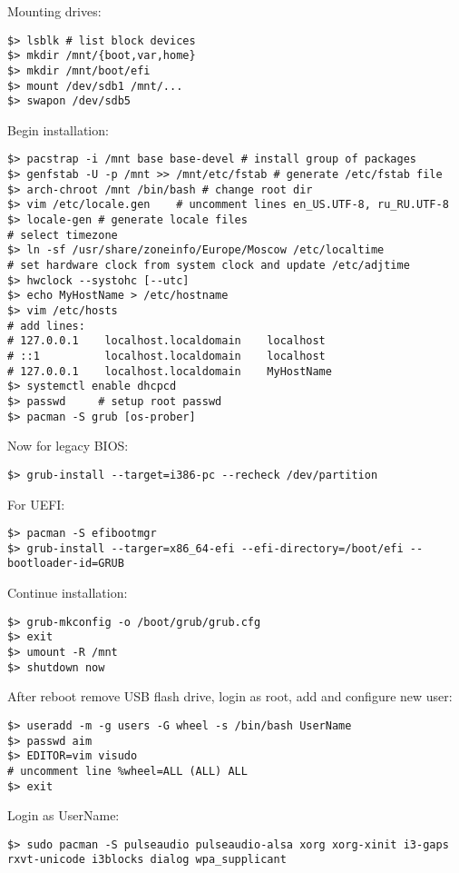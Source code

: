 \documentclass[a4paper, 12pt]{article}
\begin{document}
Mounting drives:
\begin{lstlisting}
$> lsblk # list block devices
$> mkdir /mnt/{boot,var,home}
$> mkdir /mnt/boot/efi
$> mount /dev/sdb1 /mnt/...
$> swapon /dev/sdb5
\end{lstlisting}

Begin installation:
\begin{lstlisting}
$> pacstrap -i /mnt base base-devel # install group of packages
$> genfstab -U -p /mnt >> /mnt/etc/fstab # generate /etc/fstab file
$> arch-chroot /mnt /bin/bash # change root dir
$> vim /etc/locale.gen    # uncomment lines en_US.UTF-8, ru_RU.UTF-8
$> locale-gen # generate locale files
# select timezone
$> ln -sf /usr/share/zoneinfo/Europe/Moscow /etc/localtime
# set hardware clock from system clock and update /etc/adjtime
$> hwclock --systohc [--utc]
$> echo MyHostName > /etc/hostname
$> vim /etc/hosts
# add lines:
# 127.0.0.1    localhost.localdomain    localhost
# ::1          localhost.localdomain    localhost
# 127.0.0.1    localhost.localdomain    MyHostName
$> systemctl enable dhcpcd
$> passwd     # setup root passwd
$> pacman -S grub [os-prober]
\end{lstlisting}

Now for legacy BIOS:
\begin{lstlisting}
$> grub-install --target=i386-pc --recheck /dev/partition
\end{lstlisting}

For UEFI:
\begin{lstlisting}
$> pacman -S efibootmgr
$> grub-install --targer=x86_64-efi --efi-directory=/boot/efi --bootloader-id=GRUB
\end{lstlisting}

Continue installation:
\begin{lstlisting}
$> grub-mkconfig -o /boot/grub/grub.cfg
$> exit
$> umount -R /mnt
$> shutdown now
\end{lstlisting}

After reboot remove USB flash drive, login as root, add and configure new user:
\begin{lstlisting}
$> useradd -m -g users -G wheel -s /bin/bash UserName
$> passwd aim
$> EDITOR=vim visudo
# uncomment line %wheel=ALL (ALL) ALL
$> exit
\end{lstlisting}

Login as UserName:
\begin{lstlisting}
$> sudo pacman -S pulseaudio pulseaudio-alsa xorg xorg-xinit i3-gaps rxvt-unicode i3blocks dialog wpa_supplicant
\end{lstlisting}
\end{document}
